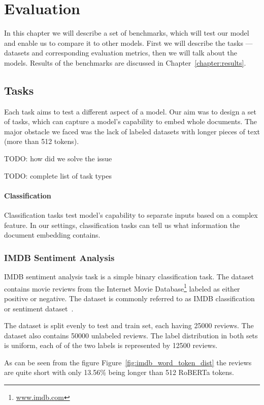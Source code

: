 \chapter{Evaluation}

In this chapter we will describe a set of benchmarks, which will test our model
and enable us to compare it to other models. First we will describe the tasks
--- datasets and corresponding evaluation metrics, then we will talk about the
models. Results of the benchmarks are discussed in
Chapter~\ref{chapter:results}.

\section{Tasks}

Each task aims to test a different aspect of a model. Our aim was to design a
set of tasks, which can capture a model's capability to embed whole documents.
The major obstacle we faced was the lack of labeled datasets with longer pieces
of text (more than 512 tokens).

TODO: how did we solve the issue

TODO: complete list of task types

\subsubsection{Classification}

Classification tasks test model's capability to separate inputs based on a
complex feature. In our settings, classification tasks can tell us what
information the document embedding contains.


\subsection{IMDB Sentiment Analysis}

IMDB sentiment analysis task is a simple binary classification task. The dataset
contains movie reviews from the Internet Movie
Database\footnote{\url{www.imdb.com}} labeled as either positive or negative.
The dataset is commonly referred to as IMDB classification or sentiment
dataset~\cite{maas11}.

The dataset is split evenly to test and train set, each having 25000 reviews.
The dataset also contains 50000 unlabeled reviews. The label distribution in
both sets is uniform, each of of the two labels is represented by 12500 reviews.

As can be seen from the figure Figure~\ref{fig:imdb_word_token_dist} the reviews
are quite short with only 13.56\% being longer than 512 RoBERTa tokens.

